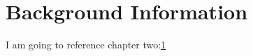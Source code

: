 \chapter{Background Information}
\label{chapter2label}

I am going to reference chapter two:\ref{chapter2label}%

\blindtext
\blindtext
\blindtext
\blindtext

